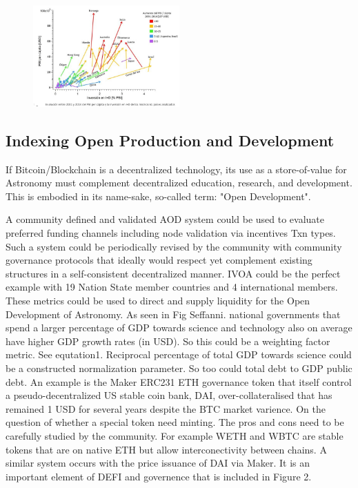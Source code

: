 \documentclass[final,5p,times,twocolumn,authoryear]{elsarticle}
\begin{document}
\begin{figure}
    \centering
    \includegraphics[width=0.5\textwidth]{figs/Docuemnto_Stefani_2.jpg}
    \caption{\href{https://aargentinapciencias.org/wp-content/uploads/2019/05/Docuemnto_Stefani.pdf}{}} 
\end{figure}
\subsection{Indexing Open Production and Development}

If Bitcoin/Blockchain is a decentralized technology, its use as a store-of-value for Astronomy must complement decentralized education, research, and development. This is embodied in its name-sake, so-called term: "Open Development".

A community defined and validated AOD system could be used to evaluate preferred funding channels including node validation via incentives Txn types. Such a system could be periodically revised by the community with community governance protocols that ideally would respect yet complement existing structures in a self-consistent decentralized manner. IVOA could be the perfect example with 19 Nation State member countries and 4 international members. These metrics could be used to direct and supply liquidity for the Open Development of Astronomy. As seen in Fig Seffanni. national governments that spend a larger percentage of GDP towards science and technology also on average have higher GDP growth rates (in USD). So this could be a weighting factor metric. See equtation1. Reciprocal percentage of total GDP towards science could be a constructed normalization parameter. So too could total debt to GDP public debt.  An example is the Maker ERC231 ETH governance token that itself control a  pseudo-decentralized US stable coin bank, DAI, over-collateralised that has remained 1 USD for several years despite the BTC market varience.  On the question of whether a special token need minting. The pros and cons need to be carefully studied by the community. For example WETH and WBTC are stable tokens that are on native ETH but allow interconectivity between chains. A similar system occurs with the price issuance of DAI via Maker. It is an important element of DEFI and governence that is included in Figure 2.   
\end{document}
